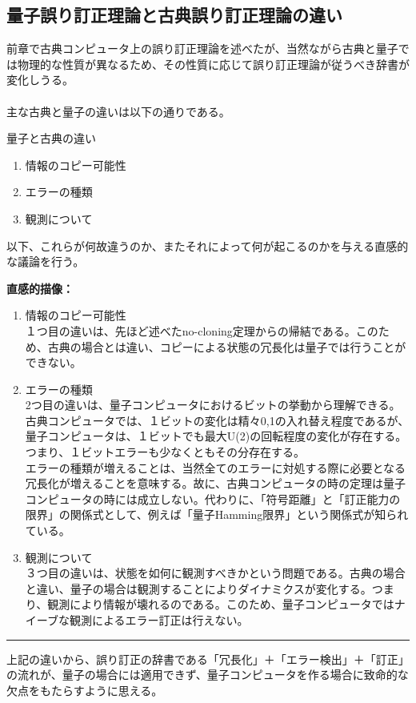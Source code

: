 \documentclass[a4paper,10.5pt]{article}
\numberwithin{equation}{section}
\newenvironment{intuitionbox}
{\begin{prooflabel}\textbf{直感的描像：}\end{prooflabel}\vspace{0.8em}}
{\par\vspace{1em}\hrule\vspace{1em}}
\begin{document}
\subsection{量子誤り訂正理論と古典誤り訂正理論の違い}
前章で古典コンピュータ上の誤り訂正理論を述べたが、当然ながら古典と量子では物理的な性質が異なるため、その性質に応じて誤り訂正理論が従うべき辞書が変化しうる。\\
\\
主な古典と量子の違いは以下の通りである。
\begin{resultbox}{量子と古典の違い}
\begin{enumerate}
    \item 情報のコピー可能性
    \item エラーの種類
    \item 観測について
\end{enumerate}
\end{resultbox}
以下、これらが何故違うのか、またそれによって何が起こるのかを与える直感的な議論を行う。
\begin{intuitionbox}
    \begin{enumerate}
        \item 情報のコピー可能性\\
        １つ目の違いは、先ほど述べたno-cloning定理からの帰結である。このため、古典の場合とは違い、コピーによる状態の冗長化は量子では行うことができない。
        \item エラーの種類\\
        2つ目の違いは、量子コンピュータにおけるビットの挙動から理解できる。古典コンピュータでは、１ビットの変化は精々0,1の入れ替え程度であるが、量子コンピュータは、１ビットでも最大U(2)の回転程度の変化が存在する。つまり、１ビットエラーも少なくともその分存在する。\\
        エラーの種類が増えることは、当然全てのエラーに対処する際に必要となる冗長化が増えることを意味する。故に、古典コンピュータの時の定理は量子コンピュータの時には成立しない。代わりに、「符号距離」と「訂正能力の限界」の関係式として、例えば「量子Hamming限界」という関係式が知られている。
        \item 観測について\\
        ３つ目の違いは、状態を如何に観測すべきかという問題である。古典の場合と違い、量子の場合は観測することによりダイナミクスが変化する。つまり、観測により情報が壊れるのである。このため、量子コンピュータではナイーブな観測によるエラー訂正は行えない。
    \end{enumerate}
\end{intuitionbox}
上記の違いから、誤り訂正の辞書である「冗長化」＋「エラー検出」＋「訂正」の流れが、量子の場合には適用できず、量子コンピュータを作る場合に致命的な欠点をもたらすように思える。\\
\end{document}
